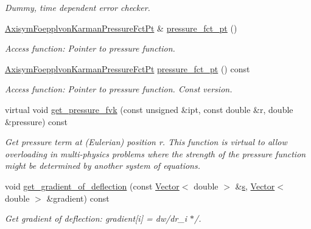 \begin{DoxyCompactItemize}
\begin{DoxyCompactList}\small\item\em Dummy, time dependent error checker. \end{DoxyCompactList}\item 
\hyperlink{classoomph_1_1AxisymFoepplvonKarmanEquations_a504878b18d793ef8a6540eb0f2b086c8}{Axisym\+Foepplvon\+Karman\+Pressure\+Fct\+Pt} \& \hyperlink{classoomph_1_1AxisymFoepplvonKarmanEquations_a65fd07792735f269b470f4e4cb3c06a2}{pressure\+\_\+fct\+\_\+pt} ()
\begin{DoxyCompactList}\small\item\em Access function\+: Pointer to pressure function. \end{DoxyCompactList}\item 
\hyperlink{classoomph_1_1AxisymFoepplvonKarmanEquations_a504878b18d793ef8a6540eb0f2b086c8}{Axisym\+Foepplvon\+Karman\+Pressure\+Fct\+Pt} \hyperlink{classoomph_1_1AxisymFoepplvonKarmanEquations_a02dd3dab84e6492d88fdd144a2eed64b}{pressure\+\_\+fct\+\_\+pt} () const
\begin{DoxyCompactList}\small\item\em Access function\+: Pointer to pressure function. Const version. \end{DoxyCompactList}\item 
virtual void \hyperlink{classoomph_1_1AxisymFoepplvonKarmanEquations_acadd8cb7ef617690c79c0c76d7ed0000}{get\+\_\+pressure\+\_\+fvk} (const unsigned \&ipt, const double \&r, double \&pressure) const
\begin{DoxyCompactList}\small\item\em Get pressure term at (Eulerian) position r. This function is virtual to allow overloading in multi-\/physics problems where the strength of the pressure function might be determined by another system of equations. \end{DoxyCompactList}\item 
void \hyperlink{classoomph_1_1AxisymFoepplvonKarmanEquations_a564c34e37df2ed58d16903221528e94c}{get\+\_\+gradient\+\_\+of\+\_\+deflection} (const \hyperlink{classoomph_1_1Vector}{Vector}$<$ double $>$ \&\hyperlink{cfortran_8h_ab7123126e4885ef647dd9c6e3807a21c}{s}, \hyperlink{classoomph_1_1Vector}{Vector}$<$ double $>$ \&gradient) const
\begin{DoxyCompactList}\small\item\em Get gradient of deflection\+: gradient\mbox{[}i\mbox{]} = dw/dr\+\_\+i $\ast$/. \end{DoxyCompactList}\item 

\end{DoxyCompactItemize}

